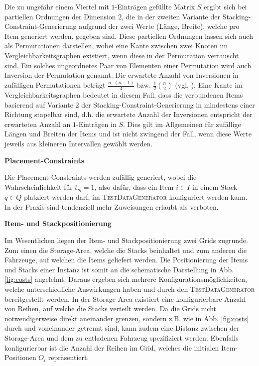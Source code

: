 Die zu ungefähr einem Viertel mit $1$-Einträgen gefüllte Matrix $S$ ergibt sich bei partiellen Ordnungen der Dimension $2$,
die in der zweiten Variante der Stacking-Constraint-Generierung aufgrund der zwei Werte (Länge, Breite),
welche pro Item generiert werden, gegeben sind.
Diese partiellen Ordnungen lassen sich auch als Permutationen darstellen, wobei eine Kante zwischen
zwei Knoten im Vergleichbarkeitsgraphen existiert, wenn diese in der Permutation
vertauscht sind. Ein solches ungeordnetes Paar von Elementen einer Permutation wird auch Inversion
der Permutation genannt. Die erwartete Anzahl von Inversionen in zufälligen Permutationen
beträgt $\frac{n \cdot (n - 1)}{4}$ bzw. $\frac{1}{2} \binom{n}{2}$ (vgl. \citet{Heuberger2012}).
Eine Kante im Vergleichbarkeitsgraphen bedeutet in diesem Fall, dass die verbundenen Items
basierend auf Variante 2 der Stacking-Constraint-Generierung in mindestens einer Richtung stapelbar sind,
d.h. die erwartete Anzahl der Inversionen entspricht der erwarteten Anzahl an $1$-Einträgen in $S$.
Dies gilt im Allgemeinen für zufällige Längen und Breiten der Items und ist nicht zwingend der Fall,
wenn diese Werte jeweils aus kleineren Intervallen gewählt werden.


\textbf{Placement-Constraints}

Die Placement-Constraints werden zufällig generiert, wobei die Wahrscheinlichkeit für $t_{iq} = 1$, also dafür,
dass ein Item $i \in I$ in einem Stack $q \in Q$ platziert werden darf, im \textsc{TestDataGenerator} konfiguriert werden kann.
In der Praxis sind tendenziell mehr Zuweisungen erlaubt als verboten.

\pagebreak

\textbf{Item- und Stackpositionierung}

Im Wesentlichen liegen der Item- und Stackpositionierung zwei Grids zugrunde. Zum einen die Storage-Area,
welche die Stacks beinhaltet und zum anderen die Fahrzeuge, auf welchen die Items geliefert werden.
Die Positionierung der Items und Stacks einer Instanz ist somit an die schematische Darstellung in Abb. \ref{fig:costs}
angelehnt. Daraus ergeben sich mehrere Konfigurationsmöglichkeiten, welche unterschiedliche Auswirkungen haben
und durch den \textsc{TestDataGenerator} bereitgestellt werden.
In der Storage-Area existiert eine konfigurierbare Anzahl von Reihen, auf welche die Stacks verteilt werden.
Da die Grids nicht notwendigerweise direkt aneinander grenzen, sondern z.B. wie in Abb. \ref{fig:costs}
durch  und  voneinander getrennt sind, kann zudem eine Distanz
zwischen der Storage-Area und dem zu entladenen Fahrzeug spezifiziert werden.
Ebenfalls konfigurierbar ist die Anzahl der Reihen im Grid, welches die initialen Item-Positionen $O_i$ repräsentiert.

